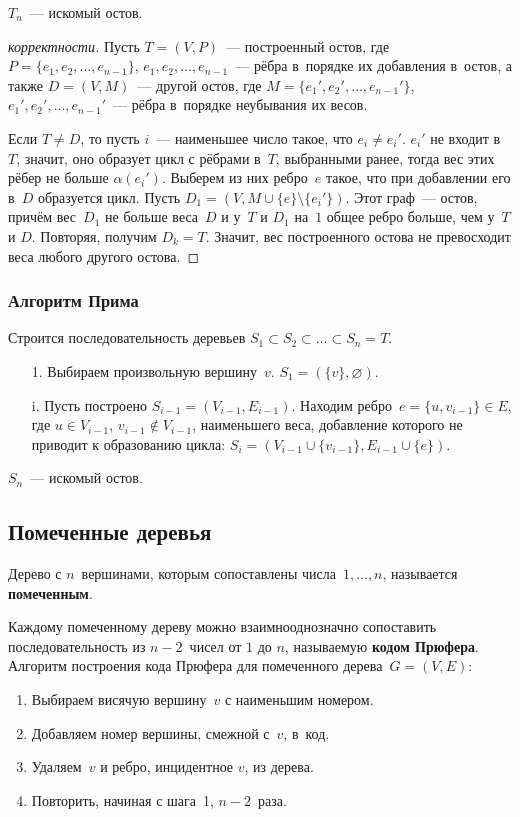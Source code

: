$T_n$~--- искомый остов.
\begin{proof}[корректности]
	Пусть $T = (V, P)$~--- построенный остов, где
	$P = \{ e_1, e_2, \ldots, e_{n-1} \}$, $e_1, e_2, \ldots, \allowbreak e_{n-1}$~--- рёбра в~порядке их добавления в~остов, а также $D = (V, M)$~--- другой остов, где
	$M = \{ e_1', e_2', \ldots, e_{n-1}' \}$, $e_1', e_2', \ldots, e_{n-1}'$~--- рёбра в~порядке неубывания их весов.
	
	Если $T \neq D$, то пусть $i$~--- наименьшее число такое, что $e_i \neq e_i'$.
	$e_i'$ не входит в~$T$, значит, оно образует цикл с рёбрами в~$T$, выбранными ранее, тогда вес этих рёбер не больше $\alpha(e_i')$.
	Выберем из них ребро~$e$ такое, что при добавлении его в~$D$ образуется цикл.
	Пусть $D_1 = (V, M \cup \{ e \} \setminus \{ e_i' \})$.
	Этот граф~--- остов, причём вес~$D_1$ не больше веса~$D$ и у~$T$ и $D_1$ на~$1$ общее ребро больше, чем у~$T$ и $D$.
	Повторяя, получим $D_k = T$.
	Значит, вес построенного остова не превосходит веса любого другого остова.
\end{proof}

\subsubsection{Алгоритм Прима}
Строится последовательность деревьев $S_1 \subset S_2 \subset \ldots \subset S_n = T$.
\begin{enumerate}
	\item[1.] Выбираем произвольную вершину~$v$.
	$S_1 = (\{ v \}, \varnothing)$.
	\item[i.] Пусть построено $S_{i-1} = (V_{i-1}, E_{i-1})$.
	Находим ребро~$e = \{ u, v_{i-1} \} \in E$, где $u \in V_{i-1}$, $v_{i-1} \notin V_{i-1}$, наименьшего веса, добавление которого не приводит к образованию цикла: $S_i = (V_{i-1} \cup \{ v_{i-1} \}, E_{i-1} \cup \{ e \})$.
\end{enumerate}

$S_n$~--- искомый остов.

\subsection{Помеченные деревья}
 Дерево с $n$~вершинами, которым сопоставлены числа~$1, \ldots, n$, называется \textbf{помеченным}.

 Каждому помеченному дереву можно взаимнооднозначно сопоставить последовательность из $n - 2$~чисел от $1$ до $n$, называемую \textbf{кодом Прюфера}.
Алгоритм построения кода Прюфера для помеченного дерева~$G = (V, E)$:
\begin{enumerate}
	\item Выбираем висячую вершину~$v$ с наименьшим номером.
	\item Добавляем номер вершины, смежной с~$v$, в~код.
	\item Удаляем~$v$ и ребро, инцидентное $v$, из дерева.
	\item Повторить, начиная с шага~1, $n - 2$~раза.
\end{enumerate}

